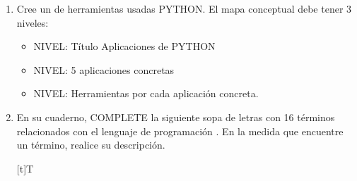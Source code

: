 \documentclass[letterpaper,10pt,spanish]{sphinxmanual}
\let\sphinxpxdimen\pdfpxdimen\else\newdimen\sphinxpxdimen
\begin{document}
\begin{enumerate}
\begin{savenotes}
\begin{tabulary}{\linewidth}[t]{T}
\begin{sphinxfigure-in-table}
\centering
\capstart
\noindent\sphinxincludegraphics[width=240\sphinxpxdimen]{{image163}.png}
\label{\detokenize{1_guias/10programacion/G1024:id4}}\end{sphinxfigure-in-table}\relax
\\
\sphinxbottomrule
\end{tabulary}
\sphinxtableafterendhook\par
\sphinxattableend\end{savenotes}
\begin{itemize}
\item {} 
\sphinxAtStartPar
Los lenguajes de programación con sus fechas van en el eje X (dos fechas por lenguaje Diciembre de 2024 y Diciembre 2025).

\item {} 
\sphinxAtStartPar
El Rating (\%) va en el eje Y.

\item {} 
\sphinxAtStartPar
Cruce con diagrama de barras.

\end{itemize}

\item {} 
\sphinxAtStartPar
Cree un  de herramientas usadas PYTHON. El mapa conceptual debe tener 3 niveles:
\begin{itemize}
\item {} 
 NIVEL: Título Aplicaciones de PYTHON

\item {} 
 NIVEL: 5 aplicaciones concretas

\item {} 
 NIVEL: Herramientas por cada aplicación concreta.

\end{itemize}

\item {} 
\sphinxAtStartPar
En su cuaderno, COMPLETE la siguiente sopa de letras con 16 términos relacionados con el lenguaje de programación . En la medida que encuentre un término, realice su descripción.


\begin{savenotes}\sphinxattablestart
\sphinxthistablewithglobalstyle
\centering
\begin{tabulary}{\linewidth}[t]{T}
\sphinxtoprule
\sphinxtableatstartofbodyhook


\end{tabulary}
\end{savenotes}
\end{enumerate}
\end{document}
